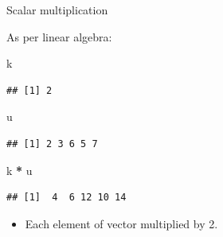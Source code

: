 \documentclass[ignorenonframetext,]{beamer}
\newenvironment{Shaded}{\begin{snugshade}}{\end{snugshade}}
\newcommand{\NormalTok}[1]{#1}
\newcommand{\OperatorTok}[1]{\textcolor[rgb]{0.81,0.36,0.00}{\textbf{#1}}}
\newcommand{\StringTok}[1]{\textcolor[rgb]{0.31,0.60,0.02}{#1}}
\providecommand{\tightlist}{%
  \setlength{\itemsep}{0pt}\setlength{\parskip}{0pt}}
\begin{document}
\begin{frame}[fragile]{Scalar multiplication}
\protect\hypertarget{scalar-multiplication}{}

As per linear algebra:

\begin{Shaded}
\begin{Highlighting}[]
\NormalTok{k}
\end{Highlighting}
\end{Shaded}

\begin{verbatim}
## [1] 2
\end{verbatim}

\begin{Shaded}
\begin{Highlighting}[]
\NormalTok{u}
\end{Highlighting}
\end{Shaded}

\begin{verbatim}
## [1] 2 3 6 5 7
\end{verbatim}

\begin{Shaded}
\begin{Highlighting}[]
\NormalTok{k }\OperatorTok{*}\StringTok{ }\NormalTok{u}
\end{Highlighting}
\end{Shaded}

\begin{verbatim}
## [1]  4  6 12 10 14
\end{verbatim}

\begin{itemize}
\tightlist
\item
  Each element of vector multiplied by 2.
\end{itemize}

\end{frame}
\end{document}
